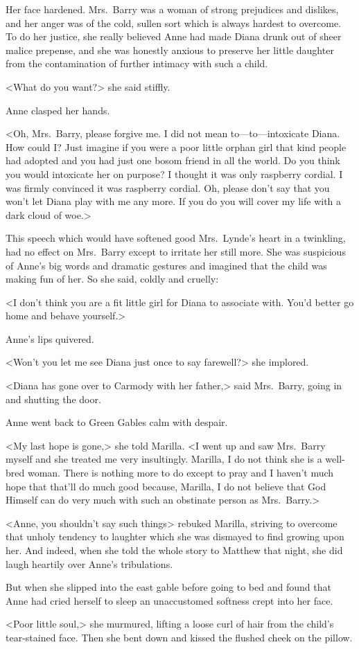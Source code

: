 Her face hardened. Mrs.~Barry was a woman of strong prejudices and dislikes, and her anger was of the cold, sullen sort which is always hardest to overcome. To do her justice, she really believed Anne had made Diana drunk out of sheer malice prepense, and she was honestly anxious to preserve her little daughter from the contamination of further intimacy with such a child.

<What do you want?> she said stiffly.

Anne clasped her hands.

<Oh, Mrs.~Barry, please forgive me. I did not mean to—to—intoxicate Diana. How could I\@? Just imagine if you were a poor little orphan girl that kind people had adopted and you had just one bosom friend in all the world. Do you think you would intoxicate her on purpose? I thought it was only raspberry cordial. I was firmly convinced it was raspberry cordial. Oh, please don't say that you won't let Diana play with me any more. If you do you will cover my life with a dark cloud of woe.>

This speech which would have softened good Mrs.~Lynde's heart in a twinkling, had no effect on Mrs.~Barry except to irritate her still more. She was suspicious of Anne's big words and dramatic gestures and imagined that the child was making fun of her. So she said, coldly and cruelly:

<I don't think you are a fit little girl for Diana to associate with. You'd better go home and behave yourself.>

Anne's lips quivered.

<Won't you let me see Diana just once to say farewell?> she implored.

<Diana has gone over to Carmody with her father,> said Mrs.~Barry, going in and shutting the door.

Anne went back to Green Gables calm with despair.

<My last hope is gone,> she told Marilla. <I went up and saw Mrs.~Barry myself and she treated me very insultingly. Marilla, I do not think she is a well-bred woman. There is nothing more to do except to pray and I haven't much hope that that'll do much good because, Marilla, I do not believe that God Himself can do very much with such an obstinate person as Mrs.~Barry.>

<Anne, you shouldn't say such things> rebuked Marilla, striving to overcome that unholy tendency to laughter which she was dismayed to find growing upon her. And indeed, when she told the whole story to Matthew that night, she did laugh heartily over Anne's tribulations.

But when she slipped into the east gable before going to bed and found that Anne had cried herself to sleep an unaccustomed softness crept into her face.

<Poor little soul,> she murmured, lifting a loose curl of hair from the child's tear-stained face. Then she bent down and kissed the flushed cheek on the pillow.